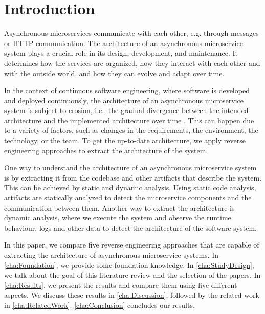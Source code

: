
\section{Introduction}
\label{cha:Introduction}
Asynchronous microservices communicate with each other, e.g. through messages or HTTP-communication.
The architecture of an asynchronous microservice system plays a crucial role in its design, development, and maintenance.
It determines how the services are organized, how they interact with each other and with the outside world, and how they can evolve and adapt over time.

In the context of continuous software engineering, where software is developed and deployed continuously, the architecture of an asynchronous microservice system is subject to erosion, i.e., the gradual divergence between the intended architecture and the implemented architecture over time \cite{DESILVA2012132}.
This can happen due to a variety of factors, such as changes in the requirements, the environment, the technology, or the team.
To get the up-to-date architecture, we apply reverse engineering approaches to extract the architecture of the system.

One way to understand the architecture of an asynchronous microservice system is by extracting it from the codebase and other artifacts that describe the system.
This can be achieved by static and dynamic analysis.
Using static code analysis, artifacts are statically analyzed to detect the microservice components and the communication between them.
Another way to extract the architecture is dynamic analysis, where we execute the system and observe the runtime behaviour, logs and other data to detect the architecture of the software-system.

In this paper, we compare five reverse engineering approaches that are capable of extracting the architecture of asynchronous microservice systems.
In \autoref{cha:Foundation}, we provide some foundation knowledge.
In \autoref{cha:StudyDesign}, we talk about the goal of this literature review and the selection of the papers.
In \autoref{cha:Results}, we present the results and compare them using five different aspects.
We discuss these results in \autoref{cha:Discussion}, followed by the related work in \autoref{cha:RelatedWork}.
\autoref{cha:Conclusion} concludes our results.
